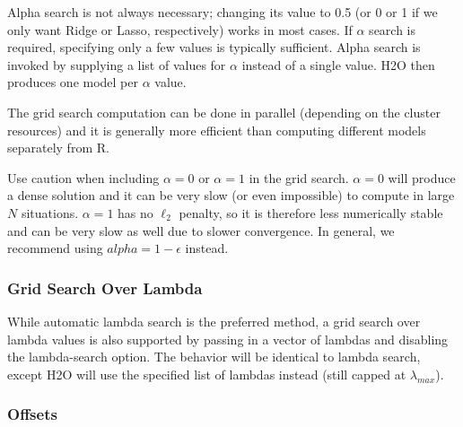 Alpha search is not always necessary; changing its value to 0.5 (or 0 or 1 if we only want Ridge or Lasso,
respectively) works in most cases. If $\alpha$ search is required, specifying only a few values is typically sufficient. Alpha
search is invoked by supplying a list of values for $\alpha$ instead of a single value. H2O then produces one model
per $\alpha$ value. 

The grid search computation can be done in parallel (depending on the cluster resources) and it
is generally more efficient than computing different models separately from R.

Use caution when including $\alpha=0$ or $\alpha=1$ in the grid search. $\alpha=0$ will produce a dense solution
and it can be very slow (or even impossible) to compute in large $N$ situations. $\alpha=1$ has no  $\ell_2$ penalty, so
it is therefore less numerically stable and can be very slow as well due to slower convergence. In general, we recommend using $alpha=1-\epsilon$ instead.

\waterExampleInR


\newpage
\waterExampleInPython


\subsubsection{Grid Search Over Lambda}

 While automatic lambda search is the preferred method,  a grid search over lambda values is also supported
 by passing in a vector of lambdas and disabling the lambda-search option. The behavior will be identical to lambda
 search, except H2O will use the specified list of lambdas instead (still capped at $\lambda_{max}$).

\waterExampleInR


\waterExampleInPython



\subsubsection{Offsets}

